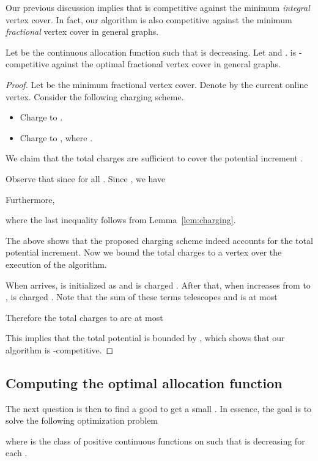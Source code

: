 \documentclass{article}
\begin{document}
Our previous discussion implies that  is competitive against the minimum {\em integral} vertex cover. In fact, our algorithm is also competitive against the minimum {\em fractional} vertex cover in general graphs.
\begin{theorem}
Let  be the continuous allocation function such that  is decreasing.
Let  and . 
 is -competitive against the optimal fractional vertex cover in general graphs.
\end{theorem}
\begin{proof}
Let  be the minimum fractional vertex cover. Denote by  the current online vertex. Consider the following charging scheme.
\begin{itemize}
\item Charge  to .
\item Charge  to , where .
\end{itemize}
We claim that the total charges are sufficient to cover the potential increment .

Observe that since  for all . Since , we have 

Furthermore,

where the last inequality follows from Lemma~\ref{lem:charging}.

The above shows that the proposed charging scheme indeed accounts for the total potential increment. Now we bound the total charges to a vertex  over the execution of the algorithm.

When  arrives,  is initialized as  and  is charged . After that, when  increases from  to ,  is charged  . Note that the sum of these terms telescopes and is at most 

Therefore the total charges to  are at most

This implies that the total potential is bounded by , which shows that our algorithm is -competitive.
\end{proof}


\subsection{Computing the optimal allocation function}
\label{sec:optimization}

The next question is then to find a good  to get a small . In essence, the goal is to solve the following optimization problem 



where  is the class of positive continuous functions on  such that  is decreasing for each .
\end{document}
